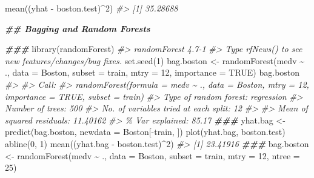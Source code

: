 \documentclass[
]{book}
\newenvironment{Shaded}{\begin{snugshade}}{\end{snugshade}}
\newcommand{\AttributeTok}[1]{\textcolor[rgb]{0.77,0.63,0.00}{#1}}
\newcommand{\CommentTok}[1]{\textcolor[rgb]{0.56,0.35,0.01}{\textit{#1}}}
\newcommand{\ConstantTok}[1]{\textcolor[rgb]{0.00,0.00,0.00}{#1}}
\newcommand{\DecValTok}[1]{\textcolor[rgb]{0.00,0.00,0.81}{#1}}
\newcommand{\DocumentationTok}[1]{\textcolor[rgb]{0.56,0.35,0.01}{\textbf{\textit{#1}}}}
\newcommand{\FunctionTok}[1]{\textcolor[rgb]{0.00,0.00,0.00}{#1}}
\newcommand{\NormalTok}[1]{#1}
\newcommand{\OtherTok}[1]{\textcolor[rgb]{0.56,0.35,0.01}{#1}}
\newcommand{\SpecialCharTok}[1]{\textcolor[rgb]{0.00,0.00,0.00}{#1}}
\begin{document}
\begin{Shaded}
\begin{Highlighting}[]
\FunctionTok{mean}\NormalTok{((yhat }\SpecialCharTok{{-}}\NormalTok{ boston.test)}\SpecialCharTok{\^{}}\DecValTok{2}\NormalTok{)}
\CommentTok{\#\textgreater{} [1] 35.28688}

\DocumentationTok{\#\# Bagging and Random Forests}

\DocumentationTok{\#\#\#}
\FunctionTok{library}\NormalTok{(randomForest)}
\CommentTok{\#\textgreater{} randomForest 4.7{-}1}
\CommentTok{\#\textgreater{} Type rfNews() to see new features/changes/bug fixes.}
\FunctionTok{set.seed}\NormalTok{(}\DecValTok{1}\NormalTok{)}
\NormalTok{bag.boston }\OtherTok{\textless{}{-}} \FunctionTok{randomForest}\NormalTok{(medv }\SpecialCharTok{\textasciitilde{}}\NormalTok{ ., }\AttributeTok{data =}\NormalTok{ Boston,}
                           \AttributeTok{subset =}\NormalTok{ train, }\AttributeTok{mtry =} \DecValTok{12}\NormalTok{, }\AttributeTok{importance =} \ConstantTok{TRUE}\NormalTok{)}
\NormalTok{bag.boston}
\CommentTok{\#\textgreater{} }
\CommentTok{\#\textgreater{} Call:}
\CommentTok{\#\textgreater{}  randomForest(formula = medv \textasciitilde{} ., data = Boston, mtry = 12, importance = TRUE,      subset = train) }
\CommentTok{\#\textgreater{}                Type of random forest: regression}
\CommentTok{\#\textgreater{}                      Number of trees: 500}
\CommentTok{\#\textgreater{} No. of variables tried at each split: 12}
\CommentTok{\#\textgreater{} }
\CommentTok{\#\textgreater{}           Mean of squared residuals: 11.40162}
\CommentTok{\#\textgreater{}                     \% Var explained: 85.17}
\DocumentationTok{\#\#\#}
\NormalTok{yhat.bag }\OtherTok{\textless{}{-}} \FunctionTok{predict}\NormalTok{(bag.boston, }\AttributeTok{newdata =}\NormalTok{ Boston[}\SpecialCharTok{{-}}\NormalTok{train, ])}
\FunctionTok{plot}\NormalTok{(yhat.bag, boston.test)}
\FunctionTok{abline}\NormalTok{(}\DecValTok{0}\NormalTok{, }\DecValTok{1}\NormalTok{)}
\FunctionTok{mean}\NormalTok{((yhat.bag }\SpecialCharTok{{-}}\NormalTok{ boston.test)}\SpecialCharTok{\^{}}\DecValTok{2}\NormalTok{)}
\CommentTok{\#\textgreater{} [1] 23.41916}
\DocumentationTok{\#\#\#}
\NormalTok{bag.boston }\OtherTok{\textless{}{-}} \FunctionTok{randomForest}\NormalTok{(medv }\SpecialCharTok{\textasciitilde{}}\NormalTok{ ., }\AttributeTok{data =}\NormalTok{ Boston,}
                           \AttributeTok{subset =}\NormalTok{ train, }\AttributeTok{mtry =} \DecValTok{12}\NormalTok{, }\AttributeTok{ntree =} \DecValTok{25}\NormalTok{)}

\end{Highlighting}
\end{Shaded}
\end{document}
